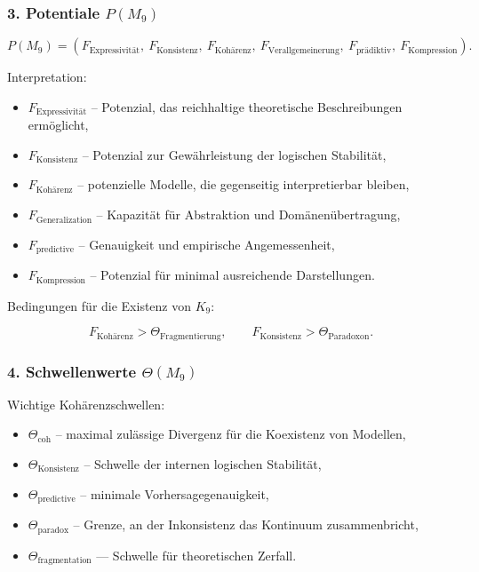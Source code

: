 \subsubsection*{3. Potentiale \texorpdfstring{$P(M_9)$}{P(M_9)}}

\[
P(M_9)=
(F_{\mathrm{Expressivität}},\
F_{\mathrm{Konsistenz}},\
F_{\mathrm{Kohärenz}},\
F_{\mathrm{Verallgemeinerung}},\
F_{\mathrm{prädiktiv}},\
F_{\mathrm{Kompression}}).
\]

Interpretation:

\begin{itemize}
    \item $F_{\mathrm{Expressivität}}$ – Potenzial, das reichhaltige theoretische Beschreibungen ermöglicht,
    \item $F_{\mathrm{Konsistenz}}$ – Potenzial zur Gewährleistung der logischen Stabilität,
    \item $F_{\mathrm{Kohärenz}}$ – potenzielle Modelle, die gegenseitig interpretierbar bleiben,
    \item $F_{\mathrm{Generalization}}$ – Kapazität für Abstraktion und Domänenübertragung,
    \item $F_{\mathrm{predictive}}$ – Genauigkeit und empirische Angemessenheit,
    \item $F_{\mathrm{Kompression}}$ – Potenzial für minimal ausreichende Darstellungen.
\end{itemize}

Bedingungen für die Existenz von $K_9$:

\[
F_{\mathrm{Kohärenz}}>\Theta_{\mathrm{Fragmentierung}},
\qquad
F_{\mathrm{Konsistenz}}>\Theta_{\mathrm{Paradoxon}}.
\]

\subsubsection*{4. Schwellenwerte \texorpdfstring{$\Theta(M_9)$}{\Theta(M_9)}}

Wichtige Kohärenzschwellen:

\begin{itemize}
    \item $\Theta_{\mathrm{coh}}$ – maximal zulässige Divergenz für die Koexistenz von Modellen,
    \item $\Theta_{\mathrm{Konsistenz}}$ – Schwelle der internen logischen Stabilität,
    \item $\Theta_{\mathrm{predictive}}$ – minimale Vorhersagegenauigkeit,
    \item $\Theta_{\mathrm{paradox}}$ – Grenze, an der Inkonsistenz das Kontinuum zusammenbricht,
    \item $\Theta_{\mathrm{fragmentation}}$ — Schwelle für theoretischen Zerfall.
\end{itemize}

